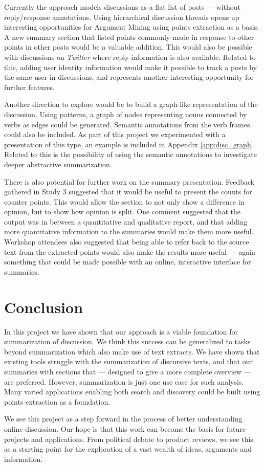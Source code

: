     Currently the approach models discussions as a flat list of posts --- without reply/response annotations. Using hierarchical discussion threads opens up interesting opportunities for Argument Mining using points extraction as a basis. A new summary section that listed points commonly made in response to other points in other posts would be a valuable addition. This would also be possible with discussions on \textit{Twitter} where reply information is also available. Related to this, adding user identity information would make it possible to track a posts by the same user in discussions, and represents another interesting opportunity for further features.

    Another direction to explore would be to build a graph-like representation of the discussion. Using patterns, a graph of nodes representing nouns connected by verbs as edges could be generated. Semantic annotations from the verb frames could also be included. As part of this project we experimented with a presentation of this type, an example is included in Appendix \ref{app:disc_graph}. Related to this is the possibility of using the semantic annotations to investigate deeper abstractive summarization.

    There is also potential for further work on the summary presentation. Feedback gathered in Study 3 suggested that it would be useful to present the counts for counter points. This would allow the section to not only show a difference in opinion, but to show how opinion is split. One comment suggested that the output was in between a quantitative and qualitative report, and that adding more quantitative information to the summaries would make them more useful. Workshop attendees also suggested that being able to refer back to the source text from the extracted points would also make the results more useful --- again something that could be made possible with an online, interactive interface for summaries.

  \section{Conclusion}
    In this project we have shown that our approach is a viable foundation for summarization of discussion. We think this success can be generalized to tasks beyond summarization which also make use of text extracts. We have shown that existing tools struggle with the summarization of discursive texts, and that our summaries with sections that --- designed to give a more complete overview --- are preferred. However, summarization is just one use case for such analysis. Many varied applications enabling both search and discovery could be built using points extraction as a foundation.

    We see this project as a step forward in the process of better understanding online discussion. Our hope is that this work can become the basis for future projects and applications. From political debate to product reviews, we see this as a starting point for the exploration of a vast wealth of ideas, arguments and information.
